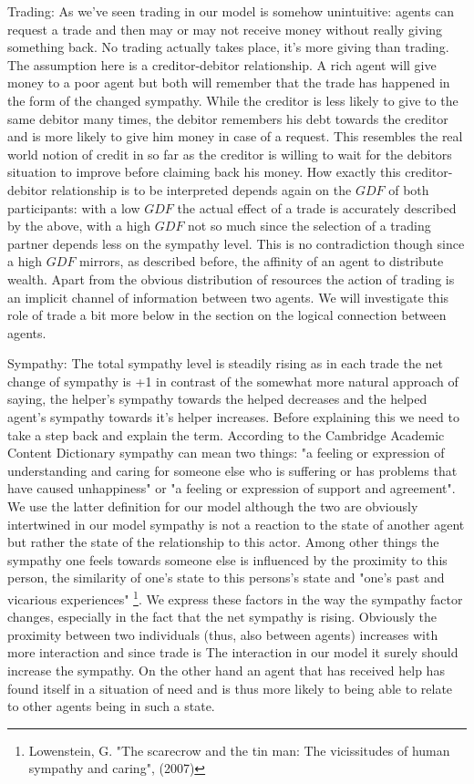 \documentclass{JASSS}
\newcommand{\gdf}{\mathit{GDF}}
\begin{document}
\begin{description*}
		\item[Trading:]
			As we've seen trading in our model is somehow unintuitive: agents can request a trade and then may or may not receive money without really giving something back. No trading actually takes place, it's more giving than trading. The assumption here is a creditor-debitor relationship. A rich agent will give money to a poor agent but both will remember that the trade has happened in the form of the changed sympathy. While the creditor is less likely to give to the same debitor many times, the debitor remembers his debt towards the creditor and is more likely to give him money in case of a request. This resembles the real world notion of credit in so far as the creditor is willing to wait for the debitors situation to improve before claiming back his money. How exactly this creditor-debitor relationship is to be interpreted depends again on the $\gdf$ of both participants: with a low $\gdf$ the actual effect of a trade is accurately described by the above, with a high $\gdf$ not so much since the selection of a trading partner depends less on the sympathy level. This is no contradiction though since a high $\gdf$ mirrors, as described before, the affinity of an agent to distribute wealth. Apart from the obvious distribution of resources the action of trading is an implicit channel of information between two agents. We will investigate this role of trade a bit more below in the section on the logical connection between agents.
			
		\item[Sympathy:]
			The total sympathy level is steadily rising as in each trade the net change of sympathy is +1 in contrast of the somewhat more natural approach of saying, the helper's sympathy towards the helped decreases and the helped agent's sympathy towards it's helper increases. Before explaining this we need to take a step back and explain the term. According to the Cambridge Academic Content Dictionary sympathy can mean two things: "a feeling or expression of understanding and caring for someone else who is suffering or has problems that have caused unhappiness" or "a feeling or expression of support and agreement". We use the latter definition for our model although the two are obviously intertwined in our model sympathy is not a reaction to the state of another agent but rather the state of the relationship to this actor. Among other things the sympathy one feels towards someone else is influenced by the proximity to this person, the similarity of one's state to this persons's state and "one's past and vicarious experiences" \footnote{Lowenstein, G. "The scarecrow and the tin man: The vicissitudes of human sympathy and caring", (2007)}. We express these factors in the way the sympathy factor changes, especially in the fact that the net sympathy is rising. Obviously the proximity between two individuals (thus, also between agents) increases with more interaction and since trade is The interaction in our model it surely should increase the sympathy. On the other hand an agent that has received help has found itself in a situation of need and is thus more likely to being able to relate to other agents being in such a state. 
	\end{description*}
	
\end{document}
